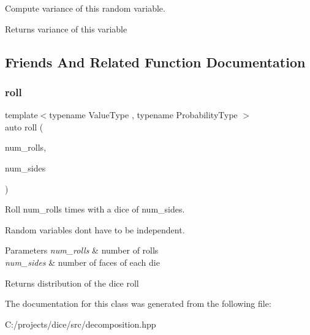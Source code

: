 Compute variance of this random variable. 

\begin{DoxyReturn}{Returns}
variance of this variable 
\end{DoxyReturn}


\subsection{Friends And Related Function Documentation}
\mbox{\label{classdice_1_1decomposition_a0c852d5e74d719a95d3056fb79e0a703}} 
\subsubsection{\texorpdfstring{roll}{roll}}
{\footnotesize\ttfamily template$<$typename Value\+Type , typename Probability\+Type $>$ \\
auto roll (\begin{DoxyParamCaption}\item[{const \mbox{\hyperlink{classdice_1_1decomposition}{decomposition}}$<$ Value\+Type, Probability\+Type $>$ \&}]{num\+\_\+rolls,  }\item[{const \mbox{\hyperlink{classdice_1_1decomposition}{decomposition}}$<$ Value\+Type, Probability\+Type $>$ \&}]{num\+\_\+sides }\end{DoxyParamCaption})\hspace{0.3cm}{\ttfamily [friend]}}



Roll num\+\_\+rolls times with a dice of num\+\_\+sides. 

Random variables don\textquotesingle{}t have to be independent.


\begin{DoxyParams}{Parameters}
{\em num\+\_\+rolls} & number of rolls \\
\hline
{\em num\+\_\+sides} & number of faces of each die\\
\hline
\end{DoxyParams}
\begin{DoxyReturn}{Returns}
distribution of the dice roll 
\end{DoxyReturn}


The documentation for this class was generated from the following file\+:\begin{DoxyCompactItemize}
\item 
C\+:/projects/dice/src/decomposition.\+hpp\end{DoxyCompactItemize}
